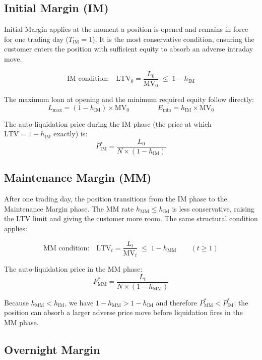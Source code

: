\documentclass[9pt, a4paper]{extarticle}
\newenvironment{formulabox}{\par\addvspace{4pt}}{\par\addvspace{4pt}}
\begin{document}
\subsection{Initial Margin (IM)}

Initial Margin applies at the moment a position is opened and remains in force for
one trading day ($T_{\mathrm{IM}} = 1$). It is the most conservative condition,
ensuring the customer enters the position with sufficient equity to absorb an adverse
intraday move.

\begin{formulabox}
\[
    \text{IM condition:} \quad \mathrm{LTV}_0 = \frac{L_0}{\mathrm{MV}_0} \;\leq\; 1 - h_{\mathrm{IM}}
\]
\end{formulabox}

The maximum loan at opening and the minimum required equity follow directly:
\[
    L_{\max} = (1 - h_{\mathrm{IM}}) \times \mathrm{MV}_0
    \qquad\qquad
    E_{\min} = h_{\mathrm{IM}} \times \mathrm{MV}_0
\]

The auto-liquidation price during the IM phase (the price at which
$\mathrm{LTV} = 1 - h_{\mathrm{IM}}$ exactly) is:
\[
    P^{*}_{\mathrm{IM}} = \frac{L_0}{N \times (1 - h_{\mathrm{IM}})}
\]

\subsection{Maintenance Margin (MM)}

After one trading day, the position transitions from the IM phase to the Maintenance
Margin phase. The MM rate $h_{\mathrm{MM}} \leq h_{\mathrm{IM}}$ is less conservative,
raising the LTV limit and giving the customer more room. The same structural condition
applies:

\begin{formulabox}
\[
    \text{MM condition:} \quad \mathrm{LTV}_t = \frac{L_t}{\mathrm{MV}_t} \;\leq\; 1 - h_{\mathrm{MM}}
    \qquad (t \geq 1)
\]
\end{formulabox}

The auto-liquidation price in the MM phase:
\[
    P^{*}_{\mathrm{MM}} = \frac{L_t}{N \times (1 - h_{\mathrm{MM}})}
\]

Because $h_{\mathrm{MM}} < h_{\mathrm{IM}}$, we have $1 - h_{\mathrm{MM}} > 1 -
h_{\mathrm{IM}}$ and therefore $P^{*}_{\mathrm{MM}} < P^{*}_{\mathrm{IM}}$: the
position can absorb a larger adverse price move before liquidation fires in the MM
phase.

\subsection{Overnight Margin}
\end{document}
